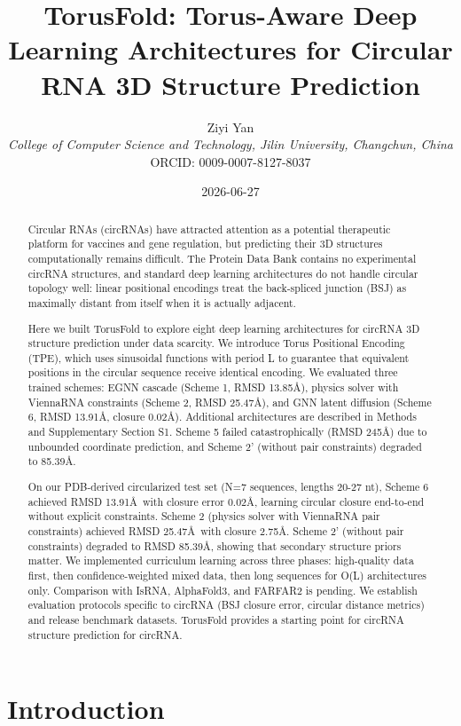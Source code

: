 \documentclass[12pt]{article}
\title{TorusFold: Torus-Aware Deep Learning Architectures for Circular RNA 3D Structure Prediction}
\author{
Ziyi Yan\\
\textit{College of Computer Science and Technology, Jilin University, Changchun, China}\\
ORCID: 0009-0007-8127-8037
}
\date{2026-06-27}
\begin{document}
\maketitle

\begin{abstract}
Circular RNAs (circRNAs) have attracted attention as a potential therapeutic platform for vaccines and gene regulation, but predicting their 3D structures computationally remains difficult. The Protein Data Bank contains no experimental circRNA structures, and standard deep learning architectures do not handle circular topology well: linear positional encodings treat the back-spliced junction (BSJ) as maximally distant from itself when it is actually adjacent.

Here we built TorusFold to explore eight deep learning architectures for circRNA 3D structure prediction under data scarcity. We introduce Torus Positional Encoding (TPE), which uses sinusoidal functions with period L to guarantee that equivalent positions in the circular sequence receive identical encoding. We evaluated three trained schemes: EGNN cascade (Scheme 1, RMSD 13.85\AA), physics solver with ViennaRNA constraints (Scheme 2, RMSD 25.47\AA), and GNN latent diffusion (Scheme 6, RMSD 13.91\AA, closure 0.02\AA). Additional architectures are described in Methods and Supplementary Section S1. Scheme 5 failed catastrophically (RMSD 245\AA) due to unbounded coordinate prediction, and Scheme 2' (without pair constraints) degraded to 85.39\AA.

On our PDB-derived circularized test set (N=7 sequences, lengths 20-27 nt), Scheme 6 achieved RMSD 13.91\AA\ with closure error 0.02\AA, learning circular closure end-to-end without explicit constraints. Scheme 2 (physics solver with ViennaRNA pair constraints) achieved RMSD 25.47\AA\ with closure 2.75\AA. Scheme 2' (without pair constraints) degraded to RMSD 85.39\AA, showing that secondary structure priors matter. We implemented curriculum learning across three phases: high-quality data first, then confidence-weighted mixed data, then long sequences for O(L) architectures only. Comparison with IsRNA, AlphaFold3, and FARFAR2 is pending. We establish evaluation protocols specific to circRNA (BSJ closure error, circular distance metrics) and release benchmark datasets. TorusFold provides a starting point for circRNA structure prediction for circRNA.
\end{abstract}

\section{Introduction}
\end{document}
